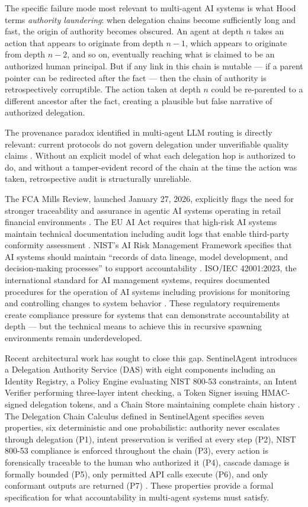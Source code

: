 The specific failure mode most relevant to multi-agent AI systems is what Hood \cite{hood2025} terms \emph{authority laundering}: when delegation chains become sufficiently long and fast, the origin of authority becomes obscured. An agent at depth $n$ takes an action that appears to originate from depth $n-1$, which appears to originate from depth $n-2$, and so on, eventually reaching what is claimed to be an authorized human principal. But if any link in this chain is mutable --- if a parent pointer can be redirected after the fact --- then the chain of authority is retrospectively corruptible. The action taken at depth $n$ could be re-parented to a different ancestor after the fact, creating a plausible but false narrative of authorized delegation.

The provenance paradox identified in multi-agent LLM routing is directly relevant: current protocols do not govern delegation under unverifiable quality claims \cite{openexecution2026}. Without an explicit model of what each delegation hop is authorized to do, and without a tamper-evident record of the chain at the time the action was taken, retrospective audit is structurally unreliable.

The FCA Mills Review, launched January 27, 2026, explicitly flags the need for stronger traceability and assurance in agentic AI systems operating in retail financial environments \cite{ssrnpolicyprovenance2026}. The EU AI Act requires that high-risk AI systems maintain technical documentation including audit logs that enable third-party conformity assessment \cite{euaiact2024}. NIST's AI Risk Management Framework specifies that AI systems should maintain ``records of data lineage, model development, and decision-making processes'' to support accountability \cite{nistairmf2023}. ISO/IEC 42001:2023, the international standard for AI management systems, requires documented procedures for the operation of AI systems including provisions for monitoring and controlling changes to system behavior \cite{iso420012023}. These regulatory requirements create compliance pressure for systems that can demonstrate accountability at depth --- but the technical means to achieve this in recursive spawning environments remain underdeveloped.

Recent architectural work has sought to close this gap. SentinelAgent introduces a Delegation Authority Service (DAS) with eight components including an Identity Registry, a Policy Engine evaluating NIST 800-53 constraints, an Intent Verifier performing three-layer intent checking, a Token Signer issuing HMAC-signed delegation tokens, and a Chain Store maintaining complete chain history \cite{sentinelagent2026}. The Delegation Chain Calculus defined in SentinelAgent specifies seven properties, six deterministic and one probabilistic: authority never escalates through delegation (P1), intent preservation is verified at every step (P2), NIST 800-53 compliance is enforced throughout the chain (P3), every action is forensically traceable to the human who authorized it (P4), cascade damage is formally bounded (P5), only permitted API calls execute (P6), and only conformant outputs are returned (P7) \cite{sentinelagent2026}. These properties provide a formal specification for what accountability in multi-agent systems must satisfy.

